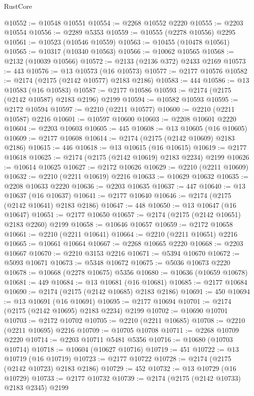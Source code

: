 \begin{lexlean}{RustCore}
\begin{coremodule}
@10552 := @10548 @10551
@10554 := @2268 @10552 @2220
@10555 := @2203 @10554
@10556 := @2289 @5353
@10559 := @10555 (@2278 @10556) @2295
@10561 := @10523 (@10546 @10559)
@10563 := @10455 (@10478 @10561)
@10565 := @10317 (@10340 @10563)
@10566 := @10062 @10565
@10568 := @2132 (@10039 @10566)
@10572 := @2133 (@2136 @372) @2433 @2169
@10573 := 443
@10576 := @13 @10573 (@16 @10573)
@10577 := @2177 @10576
@10582 := @2174 (@2175 (@2142 @10577) @2183 @2186)
@10583 := 444
@10586 := @13 @10583 (@16 @10583)
@10587 := @2177 @10586
@10593 := @2174 (@2175 (@2142 @10587) @2183 @2196) @2199
@10594 := @10582 @10593
@10595 := @2172 @10594
@10597 := @2210 (@2211 @10577)
@10600 := @2210 (@2211 @10587) @2216
@10601 := @10597 @10600
@10603 := @2208 @10601 @2220
@10604 := @2203 @10603
@10605 := 445
@10608 := @13 @10605 (@16 @10605)
@10609 := @2177 @10608
@10614 := @2174 (@2175 (@2142 @10609) @2183 @2186)
@10615 := 446
@10618 := @13 @10615 (@16 @10615)
@10619 := @2177 @10618
@10625 := @2174 (@2175 (@2142 @10619) @2183 @2234) @2199
@10626 := @10614 @10625
@10627 := @2172 @10626
@10629 := @2210 (@2211 @10609)
@10632 := @2210 (@2211 @10619) @2216
@10633 := @10629 @10632
@10635 := @2208 @10633 @2220
@10636 := @2203 @10635
@10637 := 447
@10640 := @13 @10637 (@16 @10637)
@10641 := @2177 @10640
@10646 := @2174 (@2175 (@2142 @10641) @2183 @2186)
@10647 := 448
@10650 := @13 @10647 (@16 @10647)
@10651 := @2177 @10650
@10657 := @2174 (@2175 (@2142 @10651) @2183 @2260) @2199
@10658 := @10646 @10657
@10659 := @2172 @10658
@10661 := @2210 (@2211 @10641)
@10664 := @2210 (@2211 @10651) @2216
@10665 := @10661 @10664
@10667 := @2268 @10665 @2220
@10668 := @2203 @10667
@10670 := @2210 @3153 @2216
@10671 := @5394 @10670
@10672 := @5093 @10671
@10673 := @5348 @10672
@10675 := @5036 @10673 @2220
@10678 := @10668 (@2278 @10675) @5356
@10680 := @10636 (@10659 @10678)
@10681 := 449
@10684 := @13 @10681 (@16 @10681)
@10685 := @2177 @10684
@10690 := @2174 (@2175 (@2142 @10685) @2183 @2186)
@10691 := 450
@10694 := @13 @10691 (@16 @10691)
@10695 := @2177 @10694
@10701 := @2174 (@2175 (@2142 @10695) @2183 @2234) @2199
@10702 := @10690 @10701
@10703 := @2172 @10702
@10705 := @2210 (@2211 @10685)
@10708 := @2210 (@2211 @10695) @2216
@10709 := @10705 @10708
@10711 := @2268 @10709 @2220
@10714 := @2203 @10711 @5481 @5356
@10716 := @10680 (@10703 @10714)
@10718 := @10604 (@10627 @10716)
@10719 := 451
@10722 := @13 @10719 (@16 @10719)
@10723 := @2177 @10722
@10728 := @2174 (@2175 (@2142 @10723) @2183 @2186)
@10729 := 452
@10732 := @13 @10729 (@16 @10729)
@10733 := @2177 @10732
@10739 := @2174 (@2175 (@2142 @10733) @2183 @2345) @2199

\end{coremodule}
\end{lexlean}
